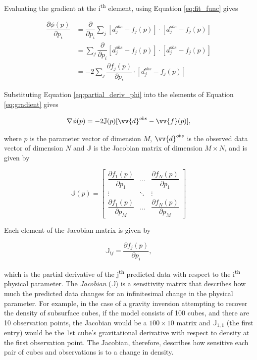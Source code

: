 \documentclass[tc, manuscript]{copernicus}
\begin{document}
Evaluating the gradient at the i\textsuperscript{th} element, using Equation \ref{eq:fit_func} gives

\begin{equation} \label{eq:partial_deriv_phi}
\begin{aligned}
    \dfrac{\partial \phi(p)}{\partial p_i} &=
    \dfrac{\partial}{\partial p_i} \sum_j{
    [d_j^{obs} - f_j(p)]\cdot[d_j^{obs} - f_j(p)]
    } \\
    &= \sum_j{\dfrac{\partial}{\partial p_i}
    [d_j^{obs} - f_j(p)]\cdot[d_j^{obs} - f_j(p)]
    } \\
    &= -2\sum_j{\dfrac{\partial f_j(p)}{\partial p_i}\cdot[d_j^{obs} - f_j(p)]
    }
\end{aligned}
\end{equation}

Substituting Equation \ref{eq:partial_deriv_phi} into the elements of Equation \ref{eq:gradient} gives

\begin{equation}
    \nabla\phi(p) =
     -2 \mathbb{J}(p)  [\vv{d}^{obs} - \vv{f}(p)],
\end{equation}

\noindent
where $p$ is the parameter vector of dimension $M$, $\vv{d}^{obs}$ is the observed data vector of dimension $N$ and $\mathbb{J}$ is the Jacobian matrix of dimension $M \times N$, and is given by

\begin{equation}
\mathbb{J}(p) =
\begin{bmatrix}
    \dfrac{\partial f_1(p)}{\partial p_1} &
        \ldots &
        \dfrac{\partial f_N(p)}{\partial p_1}
    \\
    \vdots & \ddots & \vdots
    \\
    \dfrac{\partial f_1(p)}{\partial p_M} &
        \ldots &
        \dfrac{\partial f_N(p)}{\partial p_M}
\end{bmatrix}
\label{eq:jacobian}
\end{equation}

Each element of the Jacobian matrix is given by

\begin{equation}
\mathbb{J}_{ij} =
    \dfrac{\partial f_j(p)}{\partial p_i},
\label{eq:jacobian_element}
\end{equation}

\noindent
which is the partial derivative of the j\textsuperscript{th} predicted data with respect to the i\textsuperscript{th} physical parameter. The \textit{Jacobian} ($\mathbb{J}$) is a sensitivity matrix that describes how much the predicted data changes for an infinitesimal change in the physical parameter. For example, in the case of a gravity inversion attempting to recover the density of subsurface cubes, if the model consists of 100 cubes, and there are 10 observation points, the Jacobian would be a $100 \times 10$ matrix and $\mathbb{J}_{1,1}$ (the first entry) would be the 1st cube's gravitational derivative with respect to density at the first observation point. The Jacobian, therefore, describes how sensitive each pair of cubes and observations is to a change in density. \\
\end{document}
